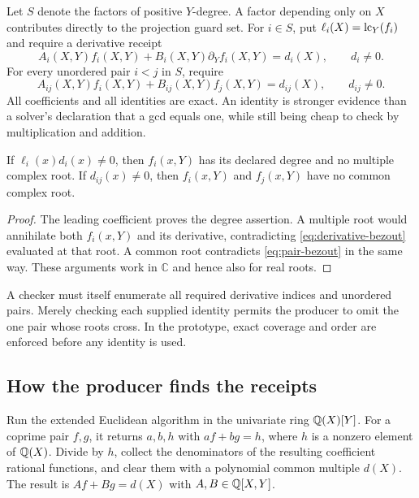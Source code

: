 Let $S$ denote the factors of positive $Y$-degree. A factor depending only on $X$ contributes directly to the projection guard set. For $i\in S$, put $\ell_i(X)=\operatorname{lc}_Y(f_i)$ and require a derivative receipt
\begin{equation}\label{eq:derivative-bezout}
 A_i(X,Y)f_i(X,Y)+B_i(X,Y)\partial_Yf_i(X,Y)=d_i(X),
 \qquad d_i\ne0.
\end{equation}
For every unordered pair $i<j$ in $S$, require
\begin{equation}\label{eq:pair-bezout}
 A_{ij}(X,Y)f_i(X,Y)+B_{ij}(X,Y)f_j(X,Y)=d_{ij}(X),
 \qquad d_{ij}\ne0.
\end{equation}
All coefficients and all identities are exact. An identity is stronger evidence than a solver's declaration that a gcd equals one, while still being cheap to check by multiplication and addition.

\begin{lemma}\label{lem:guards}
If $\ell_i(x)d_i(x)\ne0$, then $f_i(x,Y)$ has its declared degree and no multiple complex root. If $d_{ij}(x)\ne0$, then $f_i(x,Y)$ and $f_j(x,Y)$ have no common complex root.
\end{lemma}
\begin{proof}
The leading coefficient proves the degree assertion. A multiple root would annihilate both $f_i(x,Y)$ and its derivative, contradicting \eqref{eq:derivative-bezout} evaluated at that root. A common root contradicts \eqref{eq:pair-bezout} in the same way. These arguments work in $\mathbb C$ and hence also for real roots.
\end{proof}

A checker must itself enumerate all required derivative indices and unordered pairs. Merely checking each supplied identity permits the producer to omit the one pair whose roots cross. In the prototype, exact coverage and order are enforced before any identity is used.

\subsection{How the producer finds the receipts}
Run the extended Euclidean algorithm in the univariate ring $\mathbb Q(X)[Y]$. For a coprime pair $f,g$, it returns $a,b,h$ with $af+bg=h$, where $h$ is a nonzero element of $\mathbb Q(X)$. Divide by $h$, collect the denominators of the resulting coefficient rational functions, and clear them with a polynomial common multiple $d(X)$. The result is $Af+Bg=d(X)$ with $A,B\in\mathbb Q[X,Y]$.


